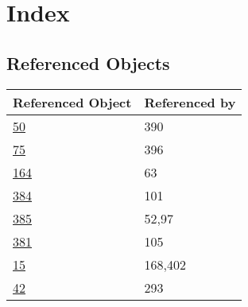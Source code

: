 \documentclass[11pt]{article}
\begin{document}
\section*{Index}
\subsection*{Referenced Objects}
\small
\renewcommand{\arraystretch}{1.2}
\raggedright
\begin{tabular}{|p{3cm}|p{10cm}|}
\hline
\textbf{Referenced Object} & \textbf{Referenced by} \\
\hline
\hyperref[obj-50]{50} & 390  \\
\hyperref[obj-75]{75} & 396  \\
\hyperref[obj-164]{164} & 63  \\
\hyperref[obj-384]{384} & 101  \\
\hyperref[obj-385]{385} & 52,97  \\
\hyperref[obj-381]{381} & 105  \\
\hyperref[obj-15]{15} & 168,402  \\
\hyperref[obj-42]{42} & 293  \\
\hline
\end{tabular}
\end{document}

